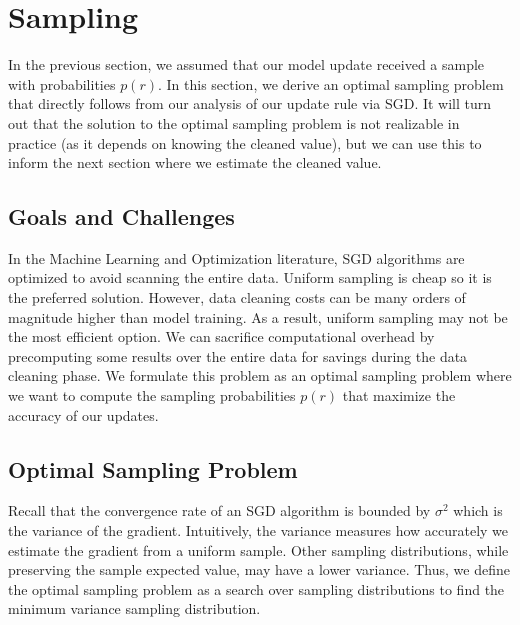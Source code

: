 \section{Sampling}\label{dist-samp}
In the previous section, we assumed that our model update received a sample with probabilities $p(r)$.
In this section, we derive an optimal sampling problem that directly follows from our analysis of our update rule via SGD.
It will turn out that the solution to the optimal sampling problem is not realizable in practice (as it depends on knowing the cleaned value), but we can use this to inform the next section where we estimate the cleaned value.

\subsection{Goals and Challenges}
In the Machine Learning and Optimization literature, SGD algorithms are optimized to avoid scanning the entire data.
Uniform sampling is cheap so it is the preferred solution.
However, data cleaning costs can be many orders of magnitude higher than model training.
As a result, uniform sampling may not be the most efficient option.
We can sacrifice computational overhead by precomputing some results over the entire data for savings during the data cleaning phase.
We formulate this problem as an optimal sampling problem where we want to compute the sampling probabilities $p(r)$ that maximize the accuracy of our updates.

\subsection{Optimal Sampling Problem}
Recall that the convergence rate of an SGD algorithm is bounded by $\sigma^2$ which is the variance of the gradient.
Intuitively, the variance measures how accurately we estimate the gradient from a uniform sample.
Other sampling distributions, while preserving the sample expected value, may have a lower variance.
Thus, we define the optimal sampling problem as a search over sampling distributions to find the minimum variance sampling distribution.

